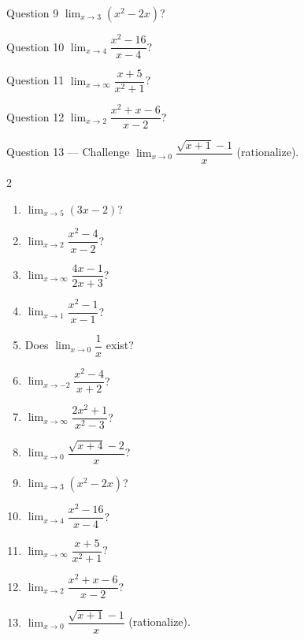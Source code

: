 \documentclass[11pt]{article}
\begin{document}
\begin{qbox}{Question 9}
$\displaystyle\lim_{x\to3}(x^2-2x)$?\workspace{2.4cm}
\end{qbox}

\begin{qbox}{Question 10}
$\displaystyle\lim_{x\to4}\dfrac{x^2-16}{x-4}$?\workspace{2.4cm}
\end{qbox}

\begin{qbox}{Question 11}
$\displaystyle\lim_{x\to\infty}\dfrac{x+5}{x^2+1}$?\workspace{2.4cm}
\end{qbox}

\begin{qbox}{Question 12}
$\displaystyle\lim_{x\to2}\dfrac{x^2+x-6}{x-2}$?\workspace{2.4cm}
\end{qbox}

\begin{qbox}{Question 13 --- Challenge}
$\displaystyle\lim_{x\to0}\dfrac{\sqrt{x+1}-1}{x}$ (rationalize).\workspace{3cm}
\end{qbox}

\clearpage
{}

\begin{recapbox}
\begin{multicols}{2}
\small
\begin{enumerate}[leftmargin=*,itemsep=3pt]
  \item $\displaystyle\lim_{x\to5}(3x-2)$?
  \item $\displaystyle\lim_{x\to2}\dfrac{x^2-4}{x-2}$?
  \item $\displaystyle\lim_{x\to\infty}\dfrac{4x-1}{2x+3}$?
  \item $\displaystyle\lim_{x\to1}\dfrac{x^2-1}{x-1}$?
  \item Does $\displaystyle\lim_{x\to0}\dfrac1x$ exist?
  \item $\displaystyle\lim_{x\to-2}\dfrac{x^2-4}{x+2}$?
  \item $\displaystyle\lim_{x\to\infty}\dfrac{2x^2+1}{x^2-3}$?
  \item $\displaystyle\lim_{x\to0}\dfrac{\sqrt{x+4}-2}{x}$?
  \item $\displaystyle\lim_{x\to3}(x^2-2x)$?
  \item $\displaystyle\lim_{x\to4}\dfrac{x^2-16}{x-4}$?
  \item $\displaystyle\lim_{x\to\infty}\dfrac{x+5}{x^2+1}$?
  \item $\displaystyle\lim_{x\to2}\dfrac{x^2+x-6}{x-2}$?
  \item $\displaystyle\lim_{x\to0}\dfrac{\sqrt{x+1}-1}{x}$ (rationalize).
\end{enumerate}
\end{multicols}
\end{recapbox}
\end{document}
